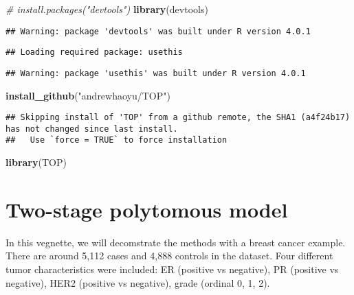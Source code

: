 \documentclass[11pt,]{article}
\newenvironment{Shaded}{\begin{snugshade}}{\end{snugshade}}
\newcommand{\CommentTok}[1]{\textcolor[rgb]{0.56,0.35,0.01}{\textit{#1}}}
\newcommand{\KeywordTok}[1]{\textcolor[rgb]{0.13,0.29,0.53}{\textbf{#1}}}
\newcommand{\NormalTok}[1]{#1}
\newcommand{\StringTok}[1]{\textcolor[rgb]{0.31,0.60,0.02}{#1}}
\begin{document}
\begin{Shaded}
\begin{Highlighting}[]
\CommentTok{# install.packages("devtools")}
\KeywordTok{library}\NormalTok{(devtools)  }
\end{Highlighting}
\end{Shaded}

\begin{verbatim}
## Warning: package 'devtools' was built under R version 4.0.1
\end{verbatim}

\begin{verbatim}
## Loading required package: usethis
\end{verbatim}

\begin{verbatim}
## Warning: package 'usethis' was built under R version 4.0.1
\end{verbatim}

\begin{Shaded}
\begin{Highlighting}[]
\KeywordTok{install_github}\NormalTok{(}\StringTok{"andrewhaoyu/TOP"}\NormalTok{)}
\end{Highlighting}
\end{Shaded}

\begin{verbatim}
## Skipping install of 'TOP' from a github remote, the SHA1 (a4f24b17) has not changed since last install.
##   Use `force = TRUE` to force installation
\end{verbatim}

\begin{Shaded}
\begin{Highlighting}[]
\KeywordTok{library}\NormalTok{(TOP)}
\end{Highlighting}
\end{Shaded}

\hypertarget{two-stage-polytomous-model}{%
\section{Two-stage polytomous model}\label{two-stage-polytomous-model}}

In this vegnette, we will decomstrate the methods with a breast cancer
example. There are around 5,112 cases and 4,888 controls in the dataset.
Four different tumor characteristics were included: ER (positive vs
negative), PR (positive vs negative), HER2 (positive vs negative), grade
(ordinal 0, 1, 2).
\end{document}
